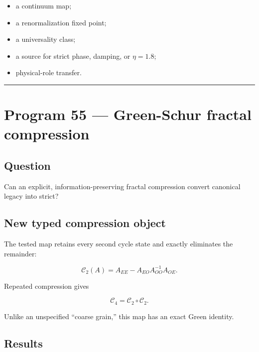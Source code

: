 \documentclass[11pt,a4paper,openany]{report}
\begin{document}
\begin{itemize}
\item 
a continuum map;

\item 
a renormalization fixed point;

\item 
a universality class;

\item 
a source for strict phase, damping, or \(\eta=1.8\);

\item 
physical-role transfer.

\end{itemize}

\par\medskip\hrule\medskip

\chapter{Program 55 — Green-Schur fractal compression}

\section{Question}

Can an explicit, information-preserving fractal compression convert canonical legacy into strict?

\section{New typed compression object}

The tested map retains every second cycle state and exactly eliminates the remainder:

\[
\mathcal C_2(A)
=
A_{EE}-A_{EO}A_{OO}^{-1}A_{OE}.
\]

Repeated compression gives

\[
\mathcal C_4=\mathcal C_2\circ\mathcal C_2.
\]

Unlike an unspecified “coarse grain,” this map has an exact Green identity.

\section{Results}
\end{document}
